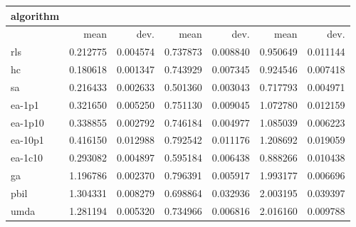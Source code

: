 \begin{tabular}{@{}l*{6}{>{{}}N{1}{2}}@{}}
\toprule
{algorithm} &  &  &  \\
\midrule
& {mean} & {dev.} & {mean} & {dev.} & {mean} & {dev.} \\
\midrule
rls & 0.212775 & 0.004574 & 0.737873 & 0.008840 & 0.950649 & 0.011144 \\
 hc & 0.180618 & 0.001347 & 0.743929 & 0.007345 & 0.924546 & 0.007418 \\
 sa & 0.216433 & 0.002633 & 0.501360 & 0.003043 & 0.717793 & 0.004971 \\
 ea-1p1 & 0.321650 & 0.005250 & 0.751130 & 0.009045 & 1.072780 & 0.012159 \\
 ea-1p10 & 0.338855 & 0.002792 & 0.746184 & 0.004977 & 1.085039 & 0.006223 \\
 ea-10p1 & 0.416150 & 0.012988 & 0.792542 & 0.011176 & 1.208692 & 0.019059 \\
 ea-1c10 & 0.293082 & 0.004897 & 0.595184 & 0.006438 & 0.888266 & 0.010438 \\
 ga & 1.196786 & 0.002370 & 0.796391 & 0.005917 & 1.993177 & 0.006696 \\
 pbil & 1.304331 & 0.008279 & 0.698864 & 0.032936 & 2.003195 & 0.039397 \\
 umda & 1.281194 & 0.005320 & 0.734966 & 0.006816 & 2.016160 & 0.009788 \\
 \bottomrule
\end{tabular}
